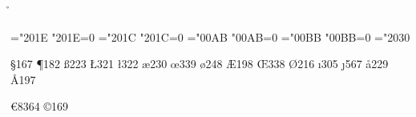 \ifx\r\undefined \else \csaccents \fi  %

\chardef\clqq="201E   \sfcode"201E=0
\chardef\crqq="201C   \sfcode"201C=0
\chardef\flqq="00AB   \sfcode"00AB=0
\chardef\frqq="00BB   \sfcode"00BB=0
\def\ogonek #1{\setbox0\hbox{#1}\ifdim\ht0=1ex\accent"02DB #1%
   \else{\ooalign{\unhbox0\crcr\hss\char"02DB}}\fi}
\chardef\promile="2030
\let\extrahyphenchar=\undefined
\let\extrahyphens=\undefined
\def\uv{\bgroup\aftergroup\closequotes\leavevmode
        \afterassignment\clqq\let\next=}
\def\closequotes{\unskip\crqq\relax}


\chardef \S  167
\chardef \P  182
\chardef \ss 223
\chardef \L  321
\chardef \l  322
\chardef \ae 230   
\chardef \oe 339
\chardef \o  248 
\chardef \AE 198   
\chardef \OE 338    
\chardef \O  216   
\chardef \i  305
\chardef \j  567
\chardef \aa 229
\chardef \AA 197   

\chardef {}
\chardef {}
\chardef {}
\chardef {}
\chardef \euro       8364
\chardef {}
\chardef \copyright  169
\chardef {}
\chardef {}


\chardef {}
\chardef {}
\chardef {}
\chardef {}
\chardef {}
\chardef {}
\chardef {}
\chardef {}
\chardef {}
\chardef {} %
\chardef {}
\chardef {}
\chardef {}  
\let\pound=\sterling

\endinput
